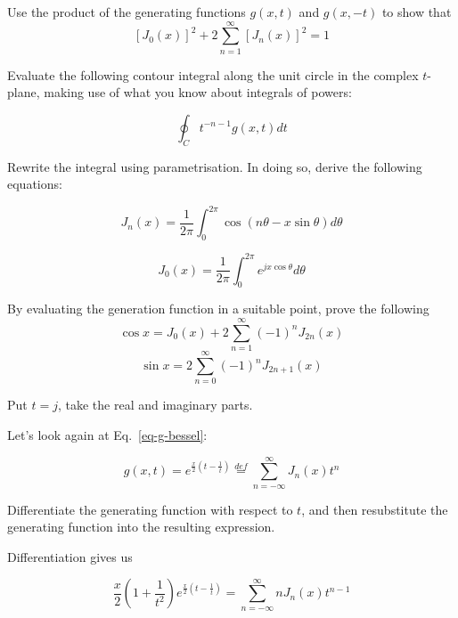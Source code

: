 \begin{exer}
Use the product of the generating functions $g(x,t)$ and $g(x,-t)$ to show that
$$\left[ J_0(x) \right]^2 + 2 \sum_{n=1}^\infty \left[ J_n(x) \right]^2 = 1 $$
\end{exer}


\pagebreak

\begin{exer}
Evaluate the following contour integral along the unit circle in the complex $t$-plane, making use of what you know about integrals of powers:

$$ \oint_C t^{-n-1} g(x,t) dt $$

Rewrite the integral using parametrisation. In doing so, derive the following equations:

$$J_n(x) = \frac {1}{2\pi} \int_0 ^ {2 \pi} \cos (n \theta - x \sin \theta ) d\theta $$

$$ J_0(x) =  \frac {1}{2\pi} \int_0 ^ {2 \pi}  e^{j x \cos \theta} d \theta $$
\end{exer}

\begin{exer}
By evaluating the generation function in a suitable point, prove the following
$$ \cos x =  J_0(x) + 2 \sum_{n=1}^\infty (-1)^n J_{2n}(x)  $$
$$ \sin x =  2 \sum_{n=0}^\infty (-1)^n J_{2n+1}(x)  $$
\begin{hnt}
Put $t=j$, take the real and imaginary parts.
\end{hnt}
\end{exer}


\pagebreak



Let's look again at Eq.~\ref{eq-g-bessel}:

$$g(x,t) =  e^{\frac{x}{2}\left(t-\frac{1}{t}\right)}   \stackrel{def}{=} \sum_{n = - \infty}^{\infty} J_n(x)t^n$$

\begin{cue}
Differentiate the generating function with respect to $t$, and then resubstitute the generating function into the resulting expression. 
\end{cue}

Differentiation gives us

\begin{equation}
\frac{x}{2}\left({1 + \frac{1}{t^2}}\right)  e^{\frac{x}{2}\left(t-\frac{1}{t}\right)}  = \sum_{n = - \infty}^{\infty} n J_n(x)t^{n-1}
\end{equation}

